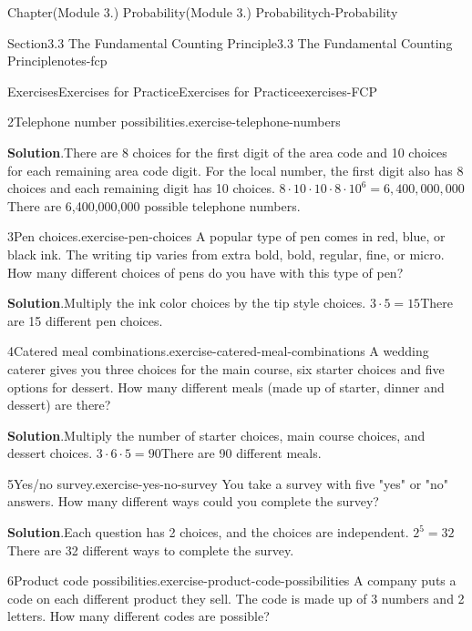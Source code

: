 \documentclass[oneside,10pt,]{book}
\newcommand{\blocktitlefont}{\relax}
\begin{document}
\begin{chapterptx}{Chapter}{(Module 3.) Probability}{}{(Module 3.) Probability}{}{}{ch-Probability}
\begin{sectionptx}{Section}{3.3 The Fundamental Counting Principle}{}{3.3 The Fundamental Counting Principle}{}{}{notes-fcp}
\begin{exercises-subsection-numberless}{Exercises}{Exercises for Practice}{}{Exercises for Practice}{}{}{exercises-FCP}
\begin{divisionexercise}{2}{Telephone number possibilities.}{}{exercise-telephone-numbers}
\par\smallskip%
\noindent\textbf{\blocktitlefont Solution}.\hypertarget{exercise-telephone-numbers-3}{}\quad{}There are 8 choices for the first digit of the area code and 10 choices for each remaining area code digit. For the local number, the first digit also has 8 choices and each remaining digit has 10 choices.%
\(8 \cdot 10 \cdot 10 \cdot 8 \cdot 10^6 = 6,400,000,000\)There are 6,400,000,000 possible telephone numbers.%
\end{divisionexercise}%
\begin{divisionexercise}{3}{Pen choices.}{}{exercise-pen-choices}%
A popular type of pen comes in red, blue, or black ink. The writing tip varies from extra bold, bold, regular, fine, or micro. How many different choices of pens do you have with this type of pen?%
\par\smallskip%
\noindent\textbf{\blocktitlefont Solution}.\hypertarget{exercise-pen-choices-3}{}\quad{}Multiply the ink color choices by the tip style choices.%
\(3 \cdot 5 = 15\)There are 15 different pen choices.%
\end{divisionexercise}%
\begin{divisionexercise}{4}{Catered meal combinations.}{}{exercise-catered-meal-combinations}%
A wedding caterer gives you three choices for the main course, six starter choices and five options for dessert. How many different meals (made up of starter, dinner and dessert) are there?%
\par\smallskip%
\noindent\textbf{\blocktitlefont Solution}.\hypertarget{exercise-catered-meal-combinations-3}{}\quad{}Multiply the number of starter choices, main course choices, and dessert choices.%
\(3 \cdot 6 \cdot 5 = 90\)There are 90 different meals.%
\end{divisionexercise}%
\begin{divisionexercise}{5}{Yes\slash{}no survey.}{}{exercise-yes-no-survey}%
You take a survey with five "yes" or "no" answers. How many different ways could you complete the survey?%
\par\smallskip%
\noindent\textbf{\blocktitlefont Solution}.\hypertarget{exercise-yes-no-survey-3}{}\quad{}Each question has 2 choices, and the choices are independent.%
\(2^5 = 32\)There are 32 different ways to complete the survey.%
\end{divisionexercise}%
\begin{divisionexercise}{6}{Product code possibilities.}{}{exercise-product-code-possibilities}%
A company puts a code on each different product they sell. The code is made up of 3 numbers and 2 letters. How many different codes are possible?%

\end{divisionexercise}
\end{exercises-subsection-numberless}
\end{sectionptx}
\end{chapterptx}
\end{document}
